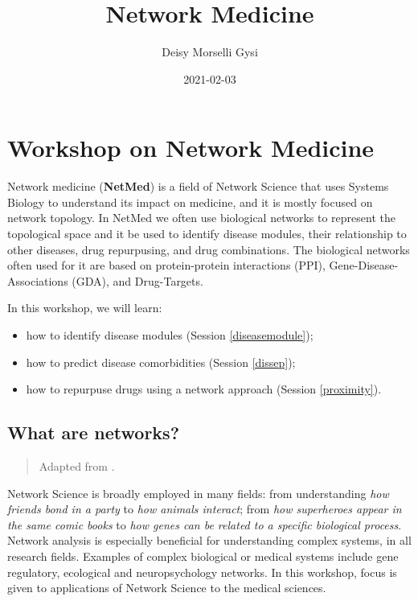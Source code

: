 \documentclass[
]{book}
\title{Network Medicine}
\author{Deisy Morselli Gysi}
\date{2021-02-03}
\providecommand{\tightlist}{%
  \setlength{\itemsep}{0pt}\setlength{\parskip}{0pt}}
\begin{document}
\maketitle

{
\setcounter{tocdepth}{1}
\tableofcontents
}
\hypertarget{workshop-on-network-medicine}{%
\chapter{Workshop on Network Medicine}\label{workshop-on-network-medicine}}

Network medicine (\textbf{NetMed}) is a field of Network Science that uses Systems Biology to understand its impact on medicine, and it is mostly focused on network topology. In NetMed we often use biological networks to represent the topological space and it be used to identify disease modules, their relationship to other diseases, drug repurpusing, and drug combinations. The biological networks often used for it are based on protein-protein interactions (PPI), Gene-Disease-Associations (GDA), and Drug-Targets.

In this workshop, we will learn:

\begin{itemize}
\tightlist
\item
  how to identify disease modules (Session \ref{diseasemodule});
\item
  how to predict disease comorbidities (Session \ref{dissep});
\item
  how to repurpuse drugs using a network approach (Session \ref{proximity}).
\end{itemize}

\hypertarget{whatarenets}{%
\section{What are networks?}\label{whatarenets}}

\begin{quote}
Adapted from \citet{Gysi2020}.
\end{quote}

Network Science is broadly employed in many fields: from understanding \emph{how friends bond in a party} to \emph{how animals interact}; from \emph{how superheroes appear in the same comic books} to \emph{how genes can be related to a specific biological process}. Network analysis is especially beneficial for understanding complex systems, in all research fields. Examples of complex biological or medical systems include gene regulatory, ecological and neuropsychology networks. In this workshop, focus is given to applications of Network Science to the medical sciences.
\end{document}
